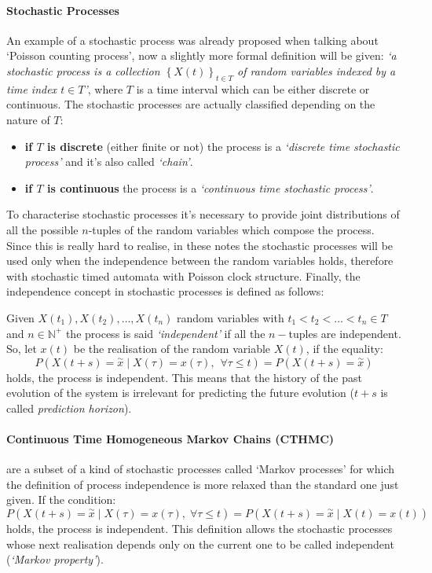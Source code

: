 \documentclass[12pt,a4paper]{article}
\begin{document}
\paragraph{Stochastic Processes}
An example of a stochastic process was already proposed when talking about `Poisson counting process', now a slightly more formal definition will be given: \emph{`a stochastic process is a collection $\left\lbrace X\left(t\right) \right\rbrace_{t\in T} $
of random variables indexed by a time index $t\in T$'}, where $T$ is a time interval which can be either discrete or continuous.
The stochastic processes are actually classified depending on the nature of $T$:
\begin{itemize}
\item \textbf{if $T$ is discrete} (either finite or not) the process is a \emph{`discrete time stochastic process'} 
and it's also called \emph{`chain'}.
\item \textbf{if $T$ is continuous} the process is a \emph{`continuous time stochastic process'}.
\end{itemize}
To characterise stochastic processes it's necessary to provide joint distributions of all the possible $n$-tuples of the random variables which compose the process. Since this is really hard to realise, in these notes the stochastic processes will be used
only when the independence between the random variables holds, therefore with stochastic timed automata with Poisson clock structure. Finally, the independence concept in stochastic processes is defined as follows:

\bigskip
\noindent 
Given $X(t_1), X(t_2),\dots, X(t_n)$ random variables with $t_1<t_2<\dots<t_n \in T$ and $n\in\mathbb{N}^+$ the process is said \textit{`independent'} if all the $n-$tuples are independent. So, let $x(t)$ be the realisation of the random variable $X(t)$, if the equality:
$$
P\left(X\left(t+s\right)=\overset{\sim}{x} \mid X\left(\tau\right)=
x\left(\tau\right),\hspace{5pt}\forall\tau\leq t\right)=
P\left(X\left(t+s\right)=\overset{\sim}{x} \right)
$$
holds, the process is independent. This means that the history of the past evolution of the system is irrelevant for predicting the future evolution ($t+s$ is called \textit{prediction horizon}).
\paragraph{Continuous Time Homogeneous Markov Chains (CTHMC)} are a subset of a kind of stochastic processes called `Markov processes' for which the definition of process independence is more relaxed than the standard one just given. If the condition:
$$
P\left(X(t+s)=\overset{\sim}{x} \mid X(\tau)=
x(\tau),\;\forall\tau\leq t\right)=
P\left(X(t+s)=\overset{\sim}{x} \mid X(t)=x(t)\right)
$$
holds, the process is independent. This definition allows the stochastic processes whose next realisation depends only on the current one to be called independent (\textit{`Markov property'}).
\end{document}
